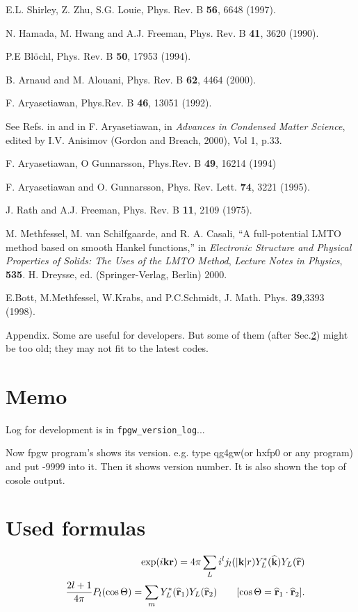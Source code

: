 \documentclass[a4paper,10pt,epsf,fleqn]{article}
\newcommand{\raw}[1]{{\tt #1}}
\begin{document}
{{{\begin{thebibliography}{00}
 E.L. Shirley, Z. Zhu, S.G. Louie, Phys. Rev. B {\bf 56}, 6648 (1997).

 N. Hamada, M. Hwang and A.J. Freeman, Phys. Rev. B {\bf  41}, 3620 (1990).

 P.E Bl\"ochl, Phys. Rev. B {\bf 50}, 17953 (1994).

 B. Arnaud and M. Alouani, Phys. Rev. B {\bf 62}, 4464 (2000).

 F. Aryasetiawan, Phys.Rev. B {\bf 46}, 13051 (1992).

 See Refs. in \cite{review_gw1,review_gw2} and in
 F. Aryasetiawan, in {\it Advances in Condensed Matter Science},
 edited by I.V. Anisimov (Gordon and Breach, 2000), Vol 1, p.33.

 F. Aryasetiawan, O Gunnarsson, Phys.Rev. B {\bf 49}, 16214 (1994)

 F. Aryasetiawan and O. Gunnarsson,
Phys. Rev. Lett. {\bf 74}, 3221 (1995).

J. Rath and A.J. Freeman, Phys. Rev. B {\bf 11}, 2109 (1975).

M. Methfessel, M. van Schilfgaarde, and R. A. Casali,
``A full-potential LMTO method based on smooth Hankel functions,''
in
{\sl Electronic Structure and Physical Properties of Solids: The Uses of the LMTO Method},
{\sl Lecture Notes in Physics}, {\bf 535}.  H. Dreysse,
ed. (Springer-Verlag, Berlin) 2000.

E.Bott, M.Methfessel, W.Krabs, and P.C.Schmidt,
J. Math. Phys. {\bf 39},3393 (1998).




\newpage
Appendix.  Some are useful for developers. But some of them 
(after Sec.\ref{usedf}) might be too old; 
they may not fit to the latest codes.

\appendix
\section{Memo}
\noindent * Log for development is in \raw{fpgw\_version\_log}...

\noindent * Now fpgw program's shows its version.
e.g. type qg4gw(or hxfp0 or any program)  and put -9999 into it. 
Then it shows version number. It is also shown the top of cosole output.


\section{Used formulas}
\label{usedf}
\begin{eqnarray}
&&\exp( i {\bf k} {\bf r}) = 4 \pi \sum_L i^l 
j_l(|{\bf k}|r)  Y^*_L( {\bf \widehat{ k} }) Y_L(\widehat{{\bf r}}) \\
&&\frac{2l+1}{4 \pi} P_l(\cos\Theta) = \sum_m Y^*_L( {\bf \widehat{r}}_1) 
Y_L({\bf \widehat{r}}_2) \ \ \ \ \ \ 
[\cos \Theta = {\bf \widehat{r}}_1 \cdot {\bf \widehat{r}}_2].
\end{eqnarray}


\end{thebibliography}}}}
\end{document}
